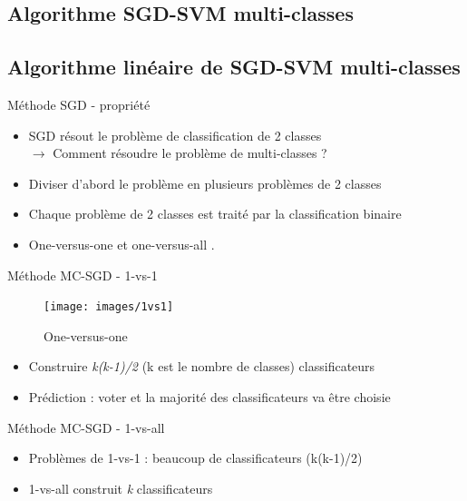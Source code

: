 \documentclass[11pt]{beamer}
\begin{document}
\begin{otherlanguage}{french}
\section{Algorithme SGD-SVM multi-classes}
\subsection{Algorithme linéaire de SGD-SVM multi-classes}
\begin{frame}{Méthode SGD - propriété}
\begin{itemize}
\item SGD résout le problème de classification de 2 classes\\
\pause
$\rightarrow$ Comment résoudre le problème de multi-classes ?
\pause
\item Diviser d'abord le problème en plusieurs problèmes de 2 classes
\pause
\item Chaque problème de 2 classes est traité par la classification binaire
\item One-versus-one \cite{vv95} et one-versus-all \cite{uk99}.
\end{itemize}
\end{frame}


\begin{frame}{Méthode MC-SGD - 1-vs-1}
\begin{figure}[ht!]
\centering
\texttt{[image: images/1vs1]}
\caption{One-versus-one}
\label{fig:1vs1}
\end{figure}
\begin{itemize}
\item Construire \textit{k(k-1)/2} (k est le nombre de classes) classificateurs
\pause
\item Prédiction : voter et la majorité des classificateurs va être choisie
\end{itemize}
\end{frame}


\begin{frame}{Méthode MC-SGD - 1-vs-all}
\begin{itemize}
\item Problèmes de 1-vs-1 : beaucoup de classificateurs (k(k-1)/2)
\item 1-vs-all construit \textit{k} classificateurs
\end{itemize}


\end{frame}
\end{otherlanguage}
\end{document}
